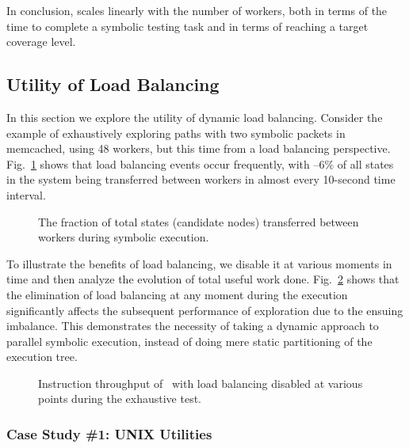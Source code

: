In conclusion, \cnine scales linearly with the number of workers, both in terms of the time to complete a symbolic testing task and in terms of reaching a target coverage level.  %


\iffalse
\subsection{Utility of Load Balancing}
\label{sec:profiling}
 
In this section we explore the utility of dynamic load balancing.  Consider the example of exhaustively exploring paths with two symbolic packets in memcached, using 48 workers, but this time from a load balancing perspective. Fig.~\ref{fig:scalab-load-balancing} shows that load balancing events occur frequently, with --6\% of all states in the system being transferred between workers in almost every 10-second time interval.

\begin{figure}[h!]
  \centering
  \caption{The fraction of total states (candidate nodes) transferred between workers during symbolic execution.}
  \label{fig:scalab-load-balancing}
\end{figure} 

To illustrate the benefits of load balancing, we disable it at various moments in time and then analyze the evolution of total useful work done. Fig.~\ref{fig:scalab-static-balancing} shows that the elimination of load balancing at any moment during the execution significantly affects the subsequent performance of exploration due to the ensuing imbalance.  This demonstrates the necessity of taking a dynamic approach to parallel symbolic execution, instead of doing mere static partitioning of the execution tree.

\begin{figure}[h!]
  \centering
  \caption{Instruction throughput of \cnine\ with load balancing disabled at various points during the exhaustive test.}
  \label{fig:scalab-static-balancing}
  \vspace{-0.5cm}
\end{figure}

\subsubsection{Case Study \#1: UNIX Utilities}
\label{sec:coreutils}

